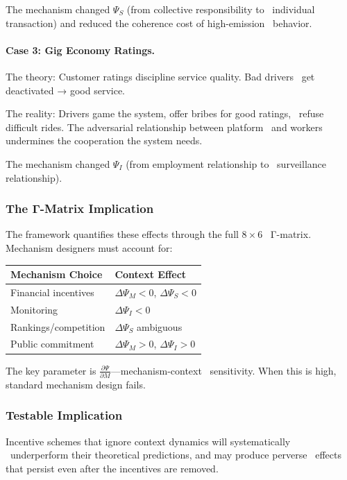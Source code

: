 The mechanism changed $\Psi_S$ (from collective responsibility to \
individual transaction) and reduced the coherence cost of high-emission \
behavior.

\paragraph{Case 3: Gig Economy Ratings.}

The theory: Customer ratings discipline service quality. Bad drivers \
get deactivated → good service.

The reality: Drivers game the system, offer bribes for good ratings, \
refuse difficult rides. The adversarial relationship between platform \
and workers undermines the cooperation the system needs.

The mechanism changed $\Psi_I$ (from employment relationship to \
surveillance relationship).

\subsubsection{The Γ-Matrix Implication}

The framework quantifies these effects through the full $8 \times 6$ \
Γ-matrix. Mechanism designers must account for:

\begin{center}
\renewcommand{\arraystretch}{1.3}
\begin{tabular}{ll}
\hline
\textbf{Mechanism Choice} & \textbf{Context Effect} \\
\hline
Financial incentives & $\Delta\Psi_M < 0$, $\Delta\Psi_S < 0$ \\
Monitoring & $\Delta\Psi_I < 0$ \\
Rankings/competition & $\Delta\Psi_S$ ambiguous \\
Public commitment & $\Delta\Psi_M > 0$, $\Delta\Psi_I > 0$ \\
\hline
\end{tabular}
\end{center}

The key parameter is $\frac{\partial \Psi}{\partial M}$---mechanism-context \
sensitivity. When this is high, standard mechanism design fails.

\subsubsection{Testable Implication}

\begin{tcolorbox}[colback=blue!5!white, colframe=blue!75!black, title=Prediction 8: Mechanism-Context Dynamics]
Incentive schemes that ignore context dynamics will systematically \
underperform their theoretical predictions, and may produce perverse \
effects that persist even after the incentives are removed.
\end{tcolorbox}

